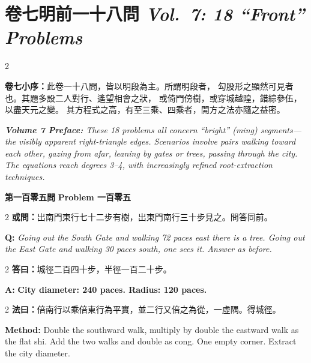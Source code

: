 \documentclass[11pt,a4paper]{article}
\newcommand{\wen}[1]{%
  \par\vspace{0.5em}%
  \noindent\textcolor{problemcolor}{\textbf{第#1問}}%
  \hfill\textcolor{problemcolor}{\textbf{Problem #1}}\par\nopagebreak%
  \vspace{0.3em}%
}
\newcommand{\owen}[1]{%
  \noindent\textcolor{problemcolor}{\textbf{或問：}}{\tradfont #1}\par\nopagebreak%
}
\newcommand{\oweneng}[1]{%
  \noindent\textcolor{engcolor}{\textbf{Q: }}{\itshape #1}\par\nopagebreak%
}
\newcommand{\fayue}[1]{%
  \noindent\textcolor{methodcolor}{\textbf{法曰：}}{\tradfont #1}\par\nopagebreak%
}
\newcommand{\fayueeng}[1]{%
  \noindent\textcolor{engcolor}{\textbf{Method: }}{#1}\par\nopagebreak%
}
\newcommand{\dayue}[1]{%
  \noindent\textcolor{anscolor}{\textbf{答曰：}}{\tradfont #1}\par\nopagebreak%
}
\newcommand{\dayueeng}[1]{%
  \noindent\textcolor{engcolor}{\textbf{A: }}{\bfseries #1}\par\nopagebreak%
}
\newcommand{\bilingsec}[2]{%
  \section{\tradfont #1 \hfill\normalfont\normalsize\textit{#2}}%
}
\newcommand{\cnpar}[1]{{\tradfont #1\par}}
\newcommand{\enpar}[1]{{\itshape #1\par}}
\begin{document}
\newpage


\bilingsec{卷七\quad 明前一十八問}{Vol.~7: 18 ``Front'' Problems}

\begin{paracol}{2}
\cnpar{%
\noindent\textbf{卷七小序：}此卷一十八問，皆以明段為主。所謂明段者，
勾股形之顯然可見者也。其題多設二人對行、遙望相會之狀，
或倚門傍樹，或穿城越隍，錯綜參伍，以盡天元之變。
其方程式之高，有至三乘、四乘者，開方之法亦隨之益密。}

\switchcolumn

\enpar{%
\noindent\textbf{Volume 7 Preface:} These 18 problems all concern ``bright'' (ming) segments---the
visibly apparent right-triangle edges. Scenarios involve pairs walking toward each other,
gazing from afar, leaning by gates or trees, passing through the city. The equations reach
degrees 3--4, with increasingly refined root-extraction techniques.}

\end{paracol}

\vspace{0.5cm}

\wen{一百零五}

\begin{paracol}{2}
\owen{出南門東行七十二步有樹，出東門南行三十步見之。問答同前。}
\switchcolumn
\oweneng{Going out the South Gate and walking 72 paces east there is a tree. Going out the East Gate and walking 30 paces south, one sees it. Answer as before.}
\end{paracol}

\begin{paracol}{2}
\dayue{城徑二百四十步，半徑一百二十步。}
\switchcolumn
\dayueeng{City diameter: 240 paces. Radius: 120 paces.}
\end{paracol}

\vspace{0.3em}

\begin{paracol}{2}
\fayue{倍南行以乘倍東行為平實，並二行又倍之為從，一虛隅。得城徑。}
\switchcolumn
\fayueeng{Double the southward walk, multiply by double the eastward walk as the flat shi. Add the two walks and double as cong. One empty corner. Extract the city diameter.}
\end{paracol}
\end{document}
